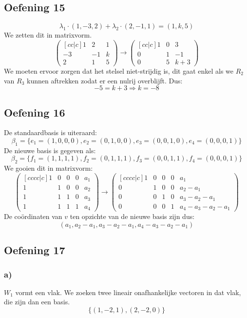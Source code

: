\documentclass[lineaire_algebra_oplossingen.tex]{subfiles}
\begin{document}
\subsection{Oefening 15}
\[
\lambda_1 \cdot (1,-3,2) + \lambda_2 \cdot (2,-1,1) = (1,k,5)
\]
We zetten dit in matrixvorm.
\[
\begin{pmatrix}[cc|c]
 1 &  2 & 1 \\
-3 & -1 & k \\
 2 &  1 & 5
\end{pmatrix}
\longrightarrow
\begin{pmatrix}[cc|c]
1 & 0 & 3 \\
0 & 1 & -1 \\
0 & 5 & k+3
\end{pmatrix}
\]
We moeten ervoor zorgen dat het stelsel niet-strijdig is, dit gaat enkel als we $R_2$ van $R_3$ kunnen aftrekken zodat er een nulrij overblijft. Dus:
\[
-5 = k+3 \Longrightarrow k = -8
\]

\subsection{Oefening 16}
De standaardbasis is uiteraard:
\[
\beta_1 = \{ e_1 = (1,0,0,0), e_2 = (0,1,0,0), e_3 = (0,0,1,0), e_4 = (0,0,0,1) \}
\]
De nieuwe basis is gegeven als:
\[
\beta_2 = \{ f_1 = (1,1,1,1), f_2 = (0,1,1,1), f_3 = (0,0,1,1), f_4 = (0,0,0,1) \}
\]
We gooien dit in matrixvorm:
\[
\begin{pmatrix}[cccc|c]
1 &0 &0 &0 & a_1 \\
1 &1 &0 &0 & a_2 \\
1 &1 &1 &0 & a_3 \\
1 &1 &1 &1 & a_4
\end{pmatrix}
\longrightarrow
\begin{pmatrix}[cccc|c]
1 &0 &0 &0 & a_1 \\
0 &1 &0 &0 & a_2-a_1 \\
0 &0 &1 &0 & a_3-a_2-a_1 \\
0 &0 &0 &1 & a_4-a_3-a_2-a_1
\end{pmatrix}
\]
De co\"ordinaten van $v$ ten opzichte van de nieuwe basis zijn dus:
\[
(a_1, a_2-a_1, a_3-a_2-a_1, a_4-a_3-a_2-a_1)
\]

\subsection{Oefening 17}
\subsubsection*{a)}
$W_1$ vormt een vlak. We zoeken twee lineair onafhankelijke vectoren in dat vlak, die zijn dan een basis.
\[
\{(1,-2,1),(2,-2,0)\}
\]
\end{document}
